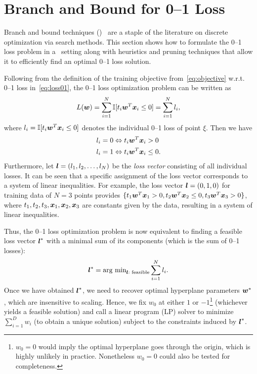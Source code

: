 \section{Branch and Bound for 0--1 Loss}
\label{cha:branchandbound}

Branch and bound techniques (\BB)~\cite{bandb} are a staple of the
literature on discrete optimization via search methods.  This section
shows how to formulate the 0--1 loss problem in a \BB\ setting along
with heuristics and pruning techniques that allow it to efficiently
find an optimal 0--1 loss solution.

Following from the definition of the training objective
from~\eqref{eq:objective} w.r.t. 0--1 loss in~\eqref{eq:loss01},
the 0--1 loss optimization problem can be written as
\begin{equation}
L(\boldsymbol{w}) = \sum_{i=1}^N \mathbb{I} [t_i \boldsymbol{w}^T \boldsymbol{x}_i \leq 0] = \sum_{i=1}^N l_i, \label{eq:loss01_data}
\end{equation}
where $l_i =\mathbb{I} [t_i \boldsymbol{w}^T \boldsymbol{x}_i \leq 0]$ denotes the individual
0--1 loss of point $\xi$.  Then we have
\[ \begin{split}
l_i = 0 &\Leftrightarrow t_i \boldsymbol{w}^T \boldsymbol{x}_i > 0 \\
l_i = 1 &\Leftrightarrow t_i \boldsymbol{w}^T \boldsymbol{x}_i \leq 0. \\
\end{split} \] 
Furthermore, let $\boldsymbol{l}=(l_1, l_2, \dots, l_N)$ be the \emph{loss vector}
consisting of all individual losses. It can be seen that a specific
assignment of the loss vector corresponds to a system of linear
inequalities. For example, the loss vector $\boldsymbol{l}=(0,1,0)$ for training
data of $N=3$ points provides 
$\{ t_1 \boldsymbol{w}^T \boldsymbol{x}_1 > 0, t_2 \boldsymbol{w}^T \boldsymbol{x}_2 \leq 0, t_3 \boldsymbol{w}^T \boldsymbol{x}_3 > 0 \}$, 
where $t_1, t_2, t_3, \boldsymbol{x}_1, \boldsymbol{x}_2, \boldsymbol{x}_3$ are constants given by the
data, resulting in a system of linear inequalities.

Thus, the 0--1 loss optimization problem is now equivalent to finding
a feasible loss vector $\boldsymbol{l}^*$ with a minimal sum of its components
(which is the sum of 0--1 losses):
\begin{equation}
\boldsymbol{l}^* = \text{arg min}_{\boldsymbol{l} : \text{ feasible}} \sum_{i=1}^N l_i. \label{eq:bb_obj}
\end{equation}
Once we have obtained $\boldsymbol{l}^*$, we need to recover optimal hyperplane
parameters $\boldsymbol{w}^*$, which are insensitive to scaling.  Hence, we fix
$w_0$ at either $1$ or $-1$\footnote{$w_0 = 0$ would imply the optimal
  hyperplane goes through the origin, which is highly unlikely in
  practice.  Nonetheless $w_0 = 0$ could also be tested for
  completeness.} (whichever yields a feasible solution) and call a
linear program (LP) solver to minimize $\sum_{i=1}^D w_i$ 
(to obtain a unique solution) subject to the constraints induced by $\boldsymbol{l}^*$.

